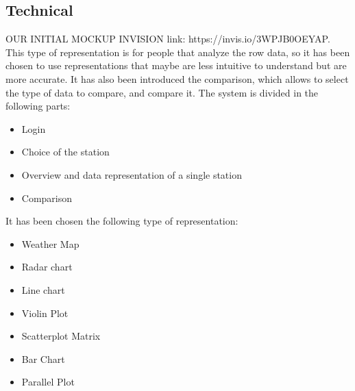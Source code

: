 \documentclass[12pt]{article} %
\begin{document}
\subsection{Technical}
OUR INITIAL MOCKUP INVISION link: https://invis.io/3WPJB0OEYAP.
This type of representation is for people that analyze the row data, so it has been chosen to use representations that maybe are less intuitive to understand but are more accurate. 
 It has also been introduced the comparison, which allows to select the type of data to compare, and compare it.
The system is divided in the following parts: 
\begin{itemize}
\item Login
\item Choice of the station
\item Overview and data representation of a single station  
\item Comparison
\end{itemize}
It has been chosen the following type of representation: 
\begin{itemize}
\item Weather Map
\item Radar chart
\item Line chart
\item Violin Plot
\item Scatterplot Matrix
\item Bar Chart
\item Parallel Plot
\end{itemize}
\end{document}
